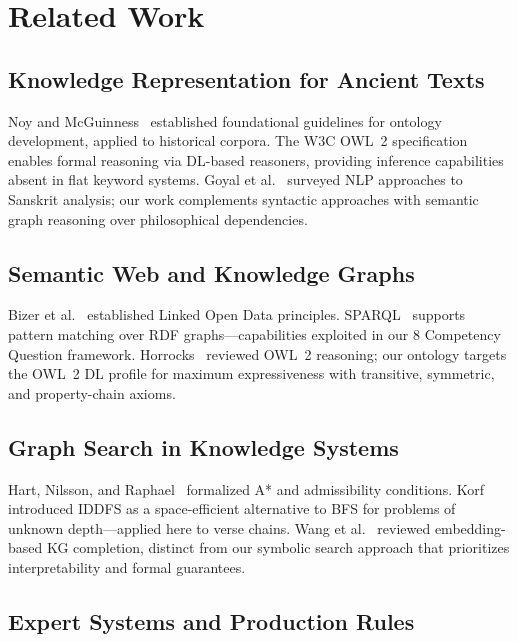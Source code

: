 \documentclass[conference]{IEEEtran}
\begin{document}
\section{Related Work}

\subsection{Knowledge Representation for Ancient Texts}

Noy and McGuinness~\cite{noy2001ontology} established foundational guidelines
for ontology development, applied to historical corpora. The W3C OWL~2
specification~\cite{mcguinness2004owl} enables formal reasoning via DL-based
reasoners, providing inference capabilities absent in flat keyword systems.
Goyal et al.~\cite{goyal2012sanskrit} surveyed NLP approaches to Sanskrit
analysis; our work complements syntactic approaches with semantic graph
reasoning over philosophical dependencies.

\subsection{Semantic Web and Knowledge Graphs}

Bizer et al.~\cite{bizer2009linked} established Linked Open Data principles.
SPARQL~\cite{harris2013sparql} supports pattern matching over RDF
graphs—capabilities exploited in our 8 Competency Question framework.
Horrocks~\cite{horrocks2008ontologies} reviewed OWL~2 reasoning; our
ontology targets the OWL~2 DL profile for maximum expressiveness with
transitive, symmetric, and property-chain axioms.

\subsection{Graph Search in Knowledge Systems}

Hart, Nilsson, and Raphael~\cite{hart1968formal} formalized A* and admissibility
conditions. Korf~\cite{korf1985depth} introduced IDDFS as a space-efficient
alternative to BFS for problems of unknown depth—applied here to verse chains.
Wang et al.~\cite{wang2014knowledge} reviewed embedding-based KG completion,
distinct from our symbolic search approach that prioritizes interpretability
and formal guarantees.

\subsection{Expert Systems and Production Rules}
\end{document}
